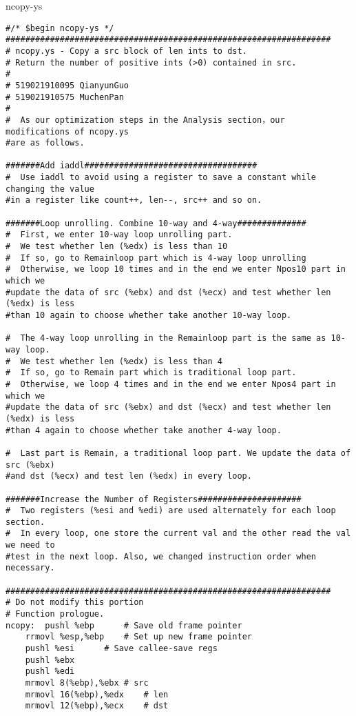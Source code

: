 \documentclass{article}
\begin{document}
\begin{center}
{\ttfamily ncopy-ys}
\end{center}
\begin{lstlisting}[language={[x86masm]Assembler}]
#/* $begin ncopy-ys */
##################################################################
# ncopy.ys - Copy a src block of len ints to dst.
# Return the number of positive ints (>0) contained in src.
#
# 519021910095 QianyunGuo
# 519021910575 MuchenPan
#
#  As our optimization steps in the Analysis section，our modifications of ncopy.ys
#are as follows.

#######Add iaddl###################################
#  Use iaddl to avoid using a register to save a constant while changing the value
#in a register like count++, len--, src++ and so on.

#######Loop unrolling. Combine 10-way and 4-way##############
#  First, we enter 10-way loop unrolling part.
#  We test whether len (%edx) is less than 10
#  If so, go to Remainloop part which is 4-way loop unrolling
#  Otherwise, we loop 10 times and in the end we enter Npos10 part in which we
#update the data of src (%ebx) and dst (%ecx) and test whether len (%edx) is less
#than 10 again to choose whether take another 10-way loop.

#  The 4-way loop unrolling in the Remainloop part is the same as 10-way loop.
#  We test whether len (%edx) is less than 4
#  If so, go to Remain part which is traditional loop part.
#  Otherwise, we loop 4 times and in the end we enter Npos4 part in which we
#update the data of src (%ebx) and dst (%ecx) and test whether len (%edx) is less
#than 4 again to choose whether take another 4-way loop.

#  Last part is Remain, a traditional loop part. We update the data of src (%ebx) 
#and dst (%ecx) and test len (%edx) in every loop.

#######Increase the Number of Registers#####################
#  Two registers (%esi and %edi) are used alternately for each loop section. 
#  In every loop, one store the current val and the other read the val we need to
#test in the next loop. Also, we changed instruction order when necessary.

##################################################################
# Do not modify this portion
# Function prologue.
ncopy:	pushl %ebp		# Save old frame pointer
	rrmovl %esp,%ebp	# Set up new frame pointer
	pushl %esi		# Save callee-save regs
	pushl %ebx
	pushl %edi
	mrmovl 8(%ebp),%ebx	# src
	mrmovl 16(%ebp),%edx	# len
	mrmovl 12(%ebp),%ecx	# dst


\end{lstlisting}
\end{document}
